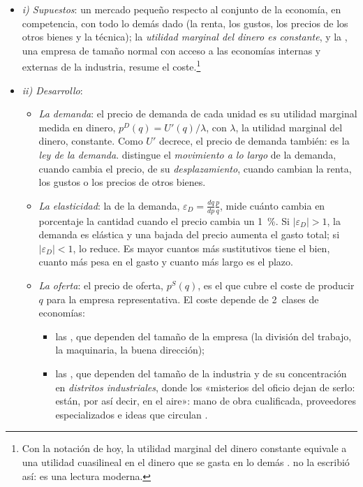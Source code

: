 \documentclass[11pt]{article}
\begin{document}
\begin{itemize}
\item \emph{i) Supuestos}: un mercado pequeño respecto al conjunto de la economía, en competencia, con todo lo demás dado (la renta, los gustos, los precios de los otros bienes y la técnica); la \emph{utilidad marginal del dinero es constante}, y la , una empresa de tamaño normal con acceso a las economías internas y externas de la industria, resume el coste\nocite{Marshall1890Principles}.\footnote{Con la notación de hoy, la utilidad marginal del dinero constante equivale a una utilidad cuasilineal en el dinero que se gasta en lo demás .  no la escribió así: es una lectura moderna.}
\item \emph{ii) Desarrollo}:
  \begin{itemize}
  \item \emph{La demanda}: el precio de demanda de cada unidad es su utilidad marginal medida en dinero, $p^D(q)=U'(q)/\lambda$, con $\lambda$, la utilidad marginal del dinero, constante. Como $U'$ decrece, el precio de demanda también: es la \emph{ley de la demanda}.  distingue el \emph{movimiento a lo largo} de la demanda, cuando cambia el precio, de su \emph{desplazamiento}, cuando cambian la renta, los gustos o los precios de otros bienes.
  \item \emph{La elasticidad}: la  de la demanda, $\varepsilon_D=\frac{dq}{dp}\frac{p}{q}$, mide cuánto cambia en porcentaje la cantidad cuando el precio cambia un 1~\%\nocite{Marshall1890Principles}. Si $|\varepsilon_D|>1$, la demanda es elástica y una bajada del precio aumenta el gasto total; si $|\varepsilon_D|<1$, lo reduce. Es mayor cuantos más sustitutivos tiene el bien, cuanto más pesa en el gasto y cuanto más largo es el plazo.
  \item \emph{La oferta}: el precio de oferta, $p^S(q)$, es el que cubre el coste de producir $q$ para la empresa representativa. El coste depende de 2~clases de economías\nocite{Marshall1890Principles}:
    \begin{itemize}
    \item las , que dependen del tamaño de la empresa (la división del trabajo, la maquinaria, la buena dirección);
    \item las , que dependen del tamaño de la industria y de su concentración en \emph{distritos industriales}, donde los «misterios del oficio dejan de serlo: están, por así decir, en el aire»: mano de obra cualificada, proveedores especializados e ideas que circulan .

\end{itemize}
\end{itemize}
\end{itemize}
\end{document}
